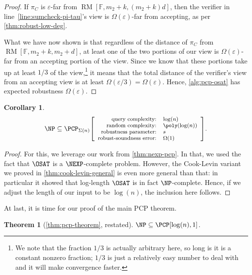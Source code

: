 \documentclass[english,12pt]{reedthesis}
\theoremstyle{plain}
\newtheorem{thm}{Theorem}[section]
\newtheorem{cor}[cor]{Corollary}
\theoremstyle{definition}
\theoremstyle{remark}
\DeclareMathOperator{\RM}{RM}
\newcommand{\pcpr}[4]{%
  \ensuremath%
  \mleft[{\footnotesize\begin{array}{r l}
    \text{query complexity:} & #1 \\
    \text{random complexity:} & #2 \\
    \text{robustness parameter:} & #3 \\
    \text{robust-soundness error:} & #4
  \end{array}}\mright]%
}
\begin{document}
\begin{proof}
  If $\pi_{C}$ is $\varepsilon$-far from $\RM[\mathbb{F}, m_{2}+k, (m_{2}+k)d]$, then the
  verifier in line~\ref{line:sumcheck-pi-tau}'s view is $\Omega(\varepsilon)$-far from accepting, as per
  \cref{thm:robust-low-deg}.

  What we have now shown is that regardless of the distance of $\pi_{C}$ from
  $\RM[\mathbb{F}, m_{2}+k, m_{2}+d]$, at least one of the two portions of our
  view is $\Omega(\varepsilon)$-far from an accepting portion of the view. Since we know that
  these portions take up at least $1/3$ of the view,\footnote{We note that the
    fraction $1/3$ is actually arbitrary here, so long is it is a constant
    nonzero fraction; $1/3$ is just a relatively easy number to deal with and it
    will make convergence faster.} it means that the total distance of the
  verifier's view from an accepting view is at least $\Omega(\varepsilon/3) = \Omega(\varepsilon)$. Hence,
  \cref{alg:pcp-osat} has expected robustness $\Omega(\varepsilon)$.
\end{proof}

\begin{cor}\label{cor:np-pcp}
  \begin{equation}\label{eqn:np-subseteq-pzkpcp}
    \NP \subseteq \PCP_{\Sigma(n)}\pcpr{\log(n)}{\poly(\log(n))}{s}{\Omega(1)}.
  \end{equation}
\end{cor}

\begin{proof}
  For this, we leverage our work from \cref{thm:nexp-pcp}. In that, we used the
  fact that $\OSAT$ is a $\NEXP$-complete problem. However, the Cook-Levin
  variant we proved in \cref{thm:cook-levin-general} is even more general than
  that: in particular it showed that log-length $\OSAT$ is in fact
  $\NP$-complete. Hence, if we adjust the length of our input to be $\log(n)$,
  the inclusion here follows.
\end{proof}

At last, it is time for our proof of the main PCP theorem.

\begin{thm}[{\cref{thm:pcp-theorem}, restated}]
  $\NP \subseteq \PCP[\log(n), 1]$.
\end{thm}
\end{document}
